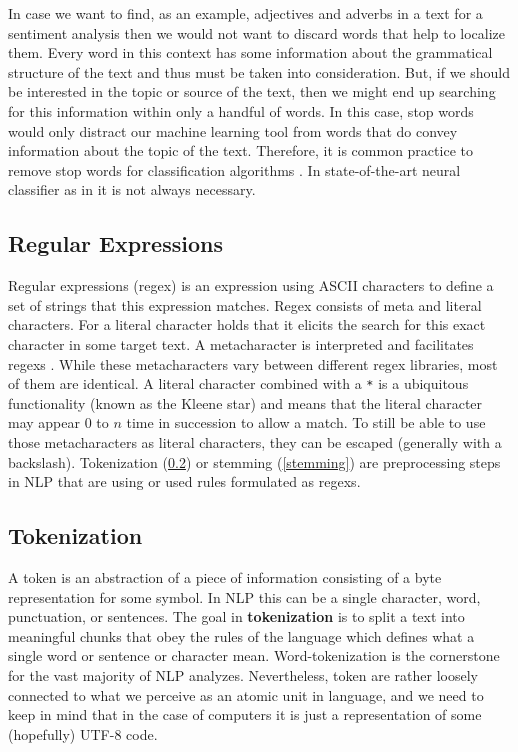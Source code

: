 In case we want to find, as an example,  adjectives and adverbs in a text for a sentiment analysis then we would not want to discard words that help to localize them.
Every word in this context has some information about the grammatical structure of the text and thus must be taken into consideration.
But, if we should be interested in the topic or source of the text, then we might end up searching for this information within only a handful of words.
In this case, stop words would only distract our machine learning tool from words that do convey information about the topic of the text.
Therefore, it is common practice to remove stop words for classification algorithms \citep{McCallum1998, Lodhi2002, Tong2001}.
In state-of-the-art neural classifier as in \citep{Howard2018} it is not always necessary.

\subsection{Regular Expressions}
Regular expressions (\gls{regex}) is an expression using ASCII characters to define a set of strings that this expression matches.
Regex consists of meta and literal characters.
For a literal character holds that it elicits the search for this exact character in some target text.
A metacharacter is interpreted and facilitates regexs \citep{Kleene1951}.
While these metacharacters vary between different regex libraries, most of them are identical.
A literal character combined with a \texttt{*} is a ubiquitous functionality (known as the Kleene star) and means that the literal character may appear $0$ to $n$ time in succession to allow a match.
To still be able to use those metacharacters as literal characters, they can be escaped (generally with a backslash).
Tokenization (\ref{tokenization}) or stemming (\ref{stemming}) are preprocessing steps in NLP that are using or used rules formulated as regexs.

\subsection{Tokenization}\label{tokenization}
A token is an abstraction of a piece of information consisting of a byte representation for some symbol.
In NLP this can be a single character, word, punctuation, or sentences.
The goal in \textbf{tokenization} is to split a text into meaningful chunks that obey the rules of the language which defines what a single word or sentence or character mean.
Word-tokenization is the cornerstone for the vast majority of NLP analyzes.
Nevertheless, token are rather loosely connected to what we perceive as an atomic unit in language, and we need to keep in mind that in the case of computers it is just a representation of some (hopefully) UTF-8 code.

